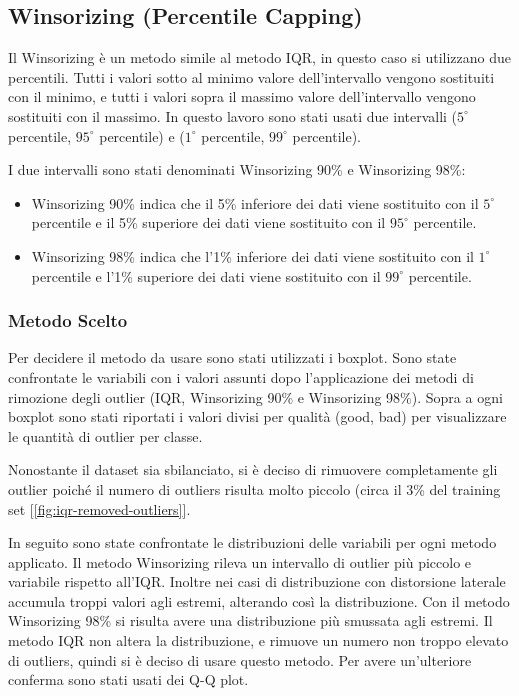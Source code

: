 \subsection{Winsorizing (Percentile Capping)}
Il Winsorizing è un metodo simile al metodo IQR, in questo caso si utilizzano due percentili. Tutti i valori sotto al minimo valore dell'intervallo vengono sostituiti con il minimo, e tutti i valori sopra il massimo valore dell'intervallo vengono sostituiti con il massimo. In questo lavoro sono stati usati due intervalli ($5^{\circ}$ percentile, $95^{\circ}$ percentile) e ($1^{\circ}$ percentile, $99^{\circ}$ percentile).

\noindent
I due intervalli sono stati denominati Winsorizing 90\% e Winsorizing 98\%:
\begin{itemize}
    \item Winsorizing 90\% indica che il 5\% inferiore dei dati viene sostituito con il $5^{\circ}$ percentile e il 5\% superiore dei dati viene sostituito con il $95^{\circ}$ percentile.
    \item Winsorizing 98\% indica che l'1\% inferiore dei dati viene sostituito con il $1^{\circ}$ percentile e l'1\% superiore dei dati viene sostituito con il $99^{\circ}$ percentile.
\end{itemize}

\newpage

\subsubsection{Metodo Scelto}
Per decidere il metodo da usare sono stati utilizzati i boxplot. Sono state confrontate le variabili con i valori assunti dopo l'applicazione dei metodi di rimozione degli outlier (IQR, Winsorizing 90\% e Winsorizing 98\%). Sopra a ogni boxplot sono stati riportati i valori divisi per qualità (good, bad) per visualizzare le quantità di outlier per classe. %

\vspace{4mm}
\noindent
Nonostante il dataset sia sbilanciato, si è deciso di rimuovere completamente gli outlier poiché il numero di outliers risulta molto piccolo (circa il 3\% del training set [\ref{fig:iqr-removed-outliers}].

\vspace{4mm}
\noindent
In seguito sono state confrontate le distribuzioni delle variabili per ogni metodo applicato. 
Il metodo Winsorizing rileva un intervallo di outlier più piccolo e variabile rispetto all'IQR. Inoltre nei casi di distribuzione con distorsione laterale accumula troppi valori agli estremi, alterando così la distribuzione. Con il metodo Winsorizing 98\% si risulta avere una distribuzione più smussata agli estremi. Il metodo IQR non altera la distribuzione, e rimuove un numero non troppo elevato di outliers, quindi si è deciso di usare questo metodo. Per avere un'ulteriore conferma sono stati usati dei Q-Q plot.

